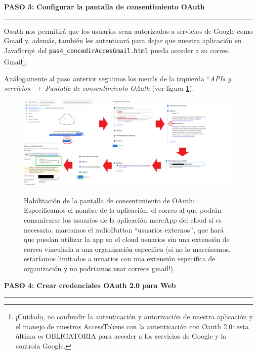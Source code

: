 \documentclass[a4paper,12pt]{report}
\begin{document}
	\noindent \textbf{PASO 3: Configurar la pantalla de consentimiento OAuth}
	\vspace{.1em}
	\hrule
	\vspace{.5em}
	
	Oauth nos permitirá que los usuarios sean autorizados a servicios de Google como Gmail y, además, también les autenticará para dejar que nuestra aplicación en JavaScript del \texttt{pas4\_concedirAccesGmail.html} pueda acceder a su correo Gmail\footnote{¡Cuidado, no confundir la autenticación y autorización de nuestra aplicación y el manejo de nuestros AccessTokens con la autenticación con Oauth 2.0: esta última es OBLIGATORIA para acceder a los servicios de Google y la controla Google.}.
	
	Análogamente al paso anterior seguimos los menús de la izquierda ``\textit{APIs y servicios} $\rightarrow$ \textit{Pantalla de consentimiento OAuth} (ver figura \ref{fig:googleCloudD}).
	
	\FloatBarrier
	\setlength{\belowcaptionskip}{3pt}
	\begin{figure}[H]
		\centering
		\caption{Habilitación de la pantalla de consentimiento de OAuth: Especificamos el nombre de la aplicación, el correo al que podrán comunicarse los usuarios de la aplicación mercApp del cloud si es necesario, marcamos el radioButton ``usuarios externos'', que hará que puedan utilizar la app en el cloud usuarios sin una extensión de correo vinculada a una organización especifica (si no lo marcásemos, estaríamos limitados a usuarios con una extensión específica de organización y no podríamos usar correos gmail!).}
		\includegraphics[width=1\linewidth]{img/googleCloudD.png}
		\label{fig:googleCloudD}
	\end{figure}
	\FloatBarrier
	
	\noindent \textbf{PASO 4: Crear credenciales OAuth 2.0 para Web}
	\vspace{.1em}
	\hrule
	\vspace{.5em}
	
\end{document}
